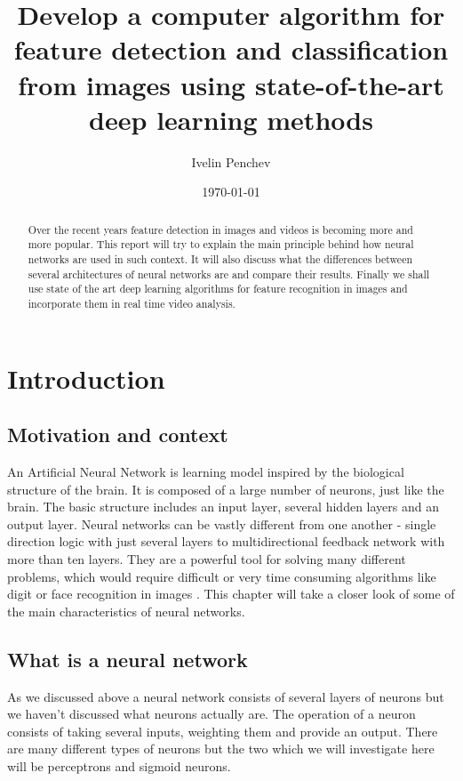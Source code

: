 \documentclass{l4proj}
\begin{document}
\title{Develop a computer algorithm for feature detection and classification from images using state-of-the-art deep learning methods}
\author{Ivelin Penchev}
\date{\today}
\maketitle

\begin{abstract}
Over the recent years feature detection in images and videos is becoming more and more popular. This report will try to explain the main principle behind how neural networks are used in such context. It will also discuss what the differences between several architectures of neural networks are and compare their results. Finally we shall use state of the art deep learning algorithms for feature recognition in images and incorporate them in real time video analysis.
\end{abstract}

\educationalconsent

\tableofcontents


\chapter{Introduction}
\section{Motivation and context}

An Artificial Neural Network is learning model inspired by the biological structure of the brain. It is composed of a large number of neurons, just like the brain. The basic structure includes an input layer, several hidden layers and an output layer.
Neural networks can be vastly different from one another - single direction logic with just several layers to multidirectional feedback network with more than ten layers. They are a powerful tool for solving many different problems, which would require difficult or very time consuming algorithms like digit or face recognition in images \cite{intro_book}. This chapter will take a closer look of some of the main characteristics of neural networks.


\section{What is a neural network}
As we discussed above a neural network consists of several layers of neurons but we haven't discussed what neurons actually are. The operation of a neuron consists of taking several inputs, weighting them and provide an output. There are many different types of neurons but the two which we will investigate here will be perceptrons and sigmoid neurons.
\end{document}
